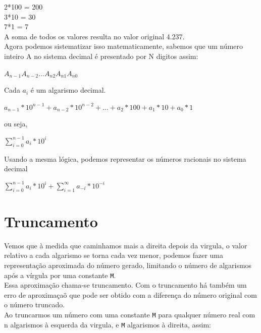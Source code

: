 \documentclass[12pt, onecolumn]{article}
\begin{document}
	2*100 	= 200\\
	3*10	= 30\\
	7*1	= 7\\
	\newline
	A soma de todos os valores resulta no valor original 4.237.\\
	\newline
	Agora podemos sistematizar isso matematicamente, sabemos que um número
	inteiro A no sistema decimal é presentado por N digitos assim:\\
	\begin{center}
		$A_{n-1} A_{n-2} ... A_{n2} A_{n1} A_{n0}$
	\end{center}
	Cada $a_{i}$ é um algarismo decimal.
	\begin{center}
		$a_{n-1}*10^{n-1} + a_{n-2}*10^{n-2}
		+ ... + 
		a_{2}*100 + a_{1} * 10 + a_{0} * 1$
	\end{center}

	ou seja,

	\begin{center}
		$\sum_{i = 0}^{n - 1} a_{i} * 10^{i}$
	\end{center}

	Usando a mesma lógica, podemos representar os números racionais no sistema
	decimal
	
	\begin{center}
		$\sum_{i = 0}^{n - 1} a_{i} * 10^{i} + 
		\sum_{i = 1}^{\infty} a_{-i} * 10^{-i}$
	\end{center}

	\section{\centering Truncamento}

	Vemos que à medida que caminhamos mais a direita depois da virgula, o
	valor relativo a cada algarismo se torna cada vez menor, podemos
	fazer uma representação aproximada do número gerado, limitando 
	o número de algarismos após a vírgula por uma constante \texttt{M}.\\
	\newline
	Essa aproximação chama-se truncamento. Com o truncamento há também
	um erro de aproximaçaõ que pode ser obtido com a diferença do número original
	com o número truncado. \\
	\newline
	Ao truncarmos um número com uma constante \texttt{M} para qualquer 
	número real com n algarismos à esquerda da virgula, 
	e \texttt{M} algarismos à direita, assim: 
\end{document}
